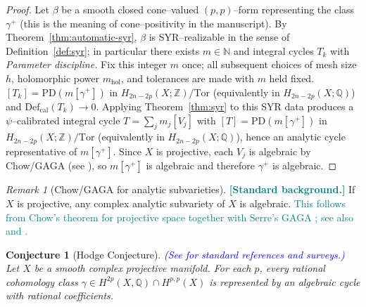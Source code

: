 \documentclass[11pt]{article}
\newcommand{\REV}[1]{\textcolor{blue}{#1}}
\newcommand{\REVMZ}[1]{\textcolor{teal}{#1}}  %
\numberwithin{equation}{section}  %
\theoremstyle{plain}
\newtheorem{conjecture}[theorem]{Conjecture}
\theoremstyle{definition}
\theoremstyle{remark}
\newtheorem{remark}[theorem]{Remark}
\newcommand{\Z}{\mathbb{Z}}
\newcommand{\Q}{\mathbb{Q}}
\newcommand{\N}{\mathbb{N}}
\newcommand{\mhol}{m_{\mathrm{hol}}} %
\newcommand{\Def}{\mathrm{Def}}
\begin{document}
\begin{proof}

Let $\beta$ be a smooth closed cone--valued $(p,p)$--form representing the class $\gamma^+$ (this is the meaning of cone--positivity in the manuscript).
By Theorem~\ref{thm:automatic-syr}, $\beta$ is SYR--realizable in the sense of Definition~\ref{def:syr}; in particular there exists $m\in\N$ and integral cycles $T_k$ with
\noindent\emph{Parameter discipline.} Fix this integer $m$ once; all subsequent choices of mesh size $h$, holomorphic power $\mhol$, and tolerances are made with $m$ held fixed.
$[T_k]=\mathrm{PD}(m[\gamma^+])$ in $H_{2n-2p}(X;\Z)/\mathrm{Tor}$ (equivalently in $H_{2n-2p}(X;\Q)$) and $\Def_{\mathrm{cal}}(T_k)\to 0$.
Applying Theorem~\ref{thm:syr} to this SYR data produces a $\psi$--calibrated integral cycle
\(T=\sum_j m_j[V_j]\)
with $[T]=\mathrm{PD}(m[\gamma^+])$ in $H_{2n-2p}(X;\Z)/\mathrm{Tor}$ (equivalently in $H_{2n-2p}(X;\Q)$), hence an analytic cycle representative of $m[\gamma^+]$.
Since $X$ is projective, each $V_j$ is algebraic by Chow/GAGA
 (see \REV{\cite{Hartshorne77,GH78,Serre56}}), so $m[\gamma^+]$ is algebraic and therefore $\gamma^+$ is algebraic.


\end{proof}



\begin{remark}[Chow/GAGA for analytic subvarieties]\label{rem:chow-gaga}
\REVMZ{\textbf{[Standard background.]}}
If $X$ is projective, any complex analytic subvariety of $X$ is algebraic.
\REVMZ{This follows from Chow's theorem \cite{Chow49} for projective space together with Serre's GAGA \cite[Thm~1]{Serre56}; see also \cite[App.~B]{GH78} and \cite[Ch.~I, \S1]{Hartshorne77}.}
\end{remark}



\begin{conjecture}[Hodge Conjecture]\label{conj:hodge-conjecture}
\REV{(See \cite{Voisin02,Lewis99} for standard references and surveys.)}
Let $X$ be a smooth complex projective manifold. For each $p$, every rational cohomology class $\gamma\in H^{2p}(X,\Q)\cap H^{p,p}(X)$ is represented by an algebraic cycle with rational coefficients.
\end{conjecture}
\end{document}

